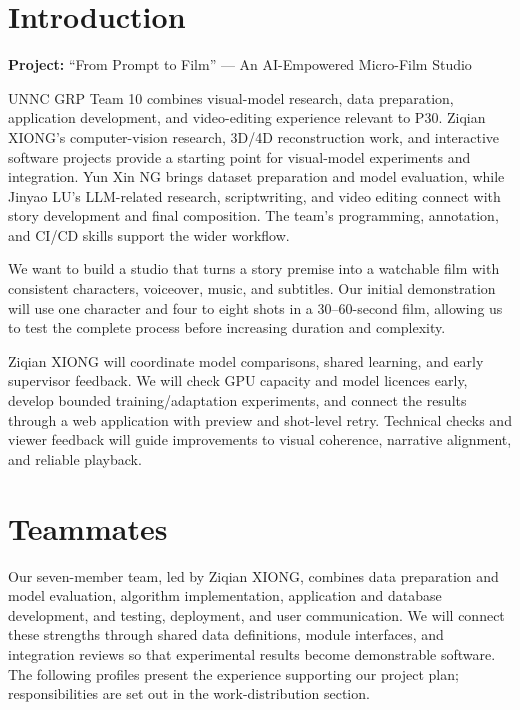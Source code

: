 \documentclass[a4paper,12pt]{article}
\title{\BidTitle}
\author{\BidTeam}
\date{\BidDate}
\newcommand{\BidProjectName}{``From Prompt to Film'' --- An AI-Empowered Micro-Film Studio}
\begin{document}
\maketitle
\thispagestyle{plain}
\tableofcontents
\newpage

\section{Introduction}
\noindent\textbf{Project:} \BidProjectName
\par\medskip
UNNC GRP Team 10 combines visual-model research, data preparation, application development, and video-editing experience relevant to P30. Ziqian XIONG's computer-vision research, 3D/4D reconstruction work, and interactive software projects provide a starting point for visual-model experiments and integration. Yun Xin NG brings dataset preparation and model evaluation, while Jinyao LU's LLM-related research, scriptwriting, and video editing connect with story development and final composition. The team's programming, annotation, and CI/CD skills support the wider workflow.

We want to build a studio that turns a story premise into a watchable film with consistent characters, voiceover, music, and subtitles. Our initial demonstration will use one character and four to eight shots in a 30--60-second film, allowing us to test the complete process before increasing duration and complexity.

Ziqian XIONG will coordinate model comparisons, shared learning, and early supervisor feedback. We will check GPU capacity and model licences early, develop bounded training/adaptation experiments, and connect the results through a web application with preview and shot-level retry. Technical checks and viewer feedback will guide improvements to visual coherence, narrative alignment, and reliable playback.

\newpage
\section{Teammates}
Our seven-member team, led by Ziqian XIONG, combines data preparation and model evaluation, algorithm implementation, application and database development, and testing, deployment, and user communication. We will connect these strengths through shared data definitions, module interfaces, and integration reviews so that experimental results become demonstrable software. The following profiles present the experience supporting our project plan; responsibilities are set out in the work-distribution section.
\end{document}
